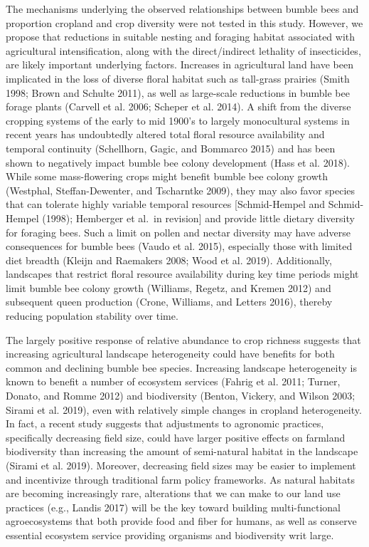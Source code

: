 \documentclass[11pt,]{article}
\begin{document}
The mechanisms underlying the observed relationships between bumble bees
and proportion cropland and crop diversity were not tested in this
study. However, we propose that reductions in suitable nesting and
foraging habitat associated with agricultural intensification, along
with the direct/indirect lethality of insecticides, are likely important
underlying factors. Increases in agricultural land have been implicated
in the loss of diverse floral habitat such as tall-grass prairies (Smith
1998; Brown and Schulte 2011), as well as large-scale reductions in
bumble bee forage plants (Carvell et al. 2006; Scheper et al. 2014). A
shift from the diverse cropping systems of the early to mid 1900's to
largely monocultural systems in recent years has undoubtedly altered
total floral resource availability and temporal continuity (Schellhorn,
Gagic, and Bommarco 2015) and has been shown to negatively impact bumble
bee colony development (Hass et al. 2018). While some mass-flowering
crops might benefit bumble bee colony growth (Westphal,
Steffan-Dewenter, and Tscharntke 2009), they may also favor species that
can tolerate highly variable temporal resources {[}Schmid-Hempel and
Schmid-Hempel (1998); Hemberger et al.~in revision{]} and provide little
dietary diversity for foraging bees. Such a limit on pollen and nectar
diversity may have adverse consequences for bumble bees (Vaudo et al.
2015), especially those with limited diet breadth (Kleijn and Raemakers
2008; Wood et al. 2019). Additionally, landscapes that restrict floral
resource availability during key time periods might limit bumble bee
colony growth (Williams, Regetz, and Kremen 2012) and subsequent queen
production (Crone, Williams, and Letters 2016), thereby reducing
population stability over time.

The largely positive response of relative abundance to crop richness
suggests that increasing agricultural landscape heterogeneity could have
benefits for both common and declining bumble bee species. Increasing
landscape heterogeneity is known to benefit a number of ecosystem
services (Fahrig et al. 2011; Turner, Donato, and Romme 2012) and
biodiversity (Benton, Vickery, and Wilson 2003; Sirami et al. 2019),
even with relatively simple changes in cropland heterogeneity. In fact,
a recent study suggests that adjustments to agronomic practices,
specifically decreasing field size, could have larger positive effects
on farmland biodiversity than increasing the amount of semi-natural
habitat in the landscape (Sirami et al. 2019). Moreover, decreasing
field sizes may be easier to implement and incentivize through
traditional farm policy frameworks. As natural habitats are becoming
increasingly rare, alterations that we can make to our land use
practices (e.g., Landis 2017) will be the key toward building
multi-functional agroecosystems that both provide food and fiber for
humans, as well as conserve essential ecosystem service providing
organisms and biodiversity writ large.
\end{document}
